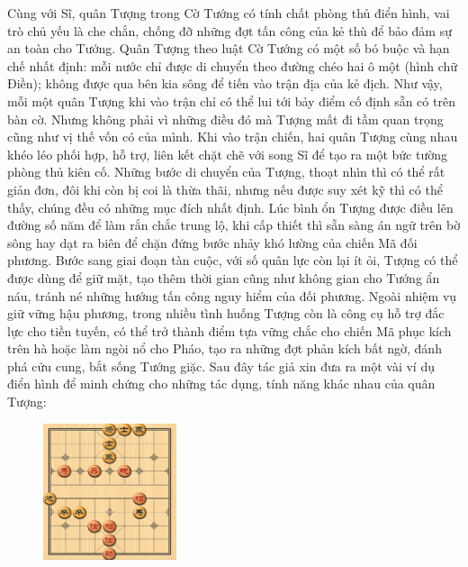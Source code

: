 \vspace*{150pt}
\begin{multicols}{2}
	Cùng với Sĩ, quân Tượng trong Cờ Tướng có tính chất phòng thủ điển hình, vai trò chủ yếu là che chắn, chống đỡ những đợt tấn công của kẻ thù để bảo đảm sự an toàn cho Tướng. Quân Tượng theo luật Cờ Tướng có một số bó buộc và hạn chế nhất định: mỗi nước chỉ được di chuyển theo đường chéo hai ô một (hình chữ Điền);  không được qua bên kia sông để tiến vào trận địa của kẻ địch. Như vậy, mỗi một quân Tượng khi vào trận  chỉ có thể lui tới bảy điểm cố định sẵn có trên bàn cờ.
	\vskip 0.05cm
	Nhưng không phải vì những điều đó mà Tượng mất đi tầm quan trọng cũng như vị thế vốn có của mình. Khi vào trận chiến, hai quân Tượng cùng nhau khéo léo phối hợp, hỗ trợ, liên kết chặt chẽ với song Sĩ để tạo ra một bức tường phòng thủ kiên cố. Những bước di chuyển của Tượng, thoạt nhìn thì có thể rất giản đơn, đôi khi còn bị coi là thừa thãi, nhưng nếu được suy xét kỹ thì có thể thấy, chúng đều có những mục đích nhất \linebreak định. Lúc bình ổn Tượng được điều lên đường số năm để làm rắn chắc trung lộ, khi cấp thiết thì sẵn sàng án ngữ trên bờ sông hay dạt ra biên để chặn đứng bước nhảy khó lường của chiến Mã đối phương. Bước sang giai đoạn tàn cuộc, với số quân lực còn lại ít ỏi, Tượng có thể được dùng để giữ mặt, tạo thêm thời gian cũng như không gian cho Tướng ẩn náu, tránh né những hướng tấn công nguy hiểm của đối phương. 
	\vskip 0.05cm
	Ngoài nhiệm vụ giữ vững hậu phương, trong nhiều tình huống Tượng còn là công cụ hỗ trợ đắc lực cho tiền tuyến, có thể trở thành điểm tựa vững chắc cho chiến Mã phục kích trên hà hoặc làm ngòi nổ cho Pháo, tạo ra những đợt phản kích bất ngờ, đánh phá cửu cung, bắt sống Tướng giặc.
	\vskip 0.05cm
	Sau đây tác giả xin đưa ra một vài ví dụ điển hình  để minh chứng cho những tác dụng, tính năng khác nhau của quân Tượng:
		\begin{figure}[H]
		\vspace*{-5pt}
		\centering
		\captionsetup{labelformat= empty, justification=centering}
		\includegraphics[width= 0.35\textwidth]{1}

\end{figure}
\end{multicols}

